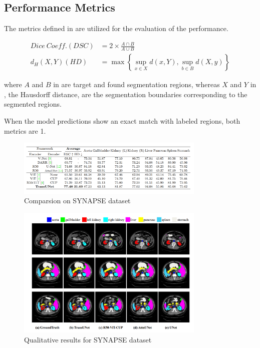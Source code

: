 \documentclass{IEEEtran}
\begin{document}
\subsection{Performance Metrics} 

The metrics defined in  are utilized for the evaluation of the performance.

\begin{align}
    Dice \ Coeff.(DSC) &= 2 \times \frac{A \cap B}{A \cup B} \label{eq:DC}\\
    d_H(X,Y) (HD) &= \max \left\{ \sup_{x\in X} d(x,Y),\sup_{b\in B} d(X,y) \right\} \label{eq:HD}
\end{align}

where $A$ and $B$ in  are target and found segmentation regions, whereas $X$ and $Y$ in , the Hausdorff distance, are the segmentation boundaries corresponding to the segmented regions.

When the model predictions show an exact match with labeled regions, both metrics are 1. 

\begin{figure}[h]
\centering
\includegraphics[width=0.8\textwidth]{img/table1.png}
\caption{Comparsion on SYNAPSE dataset}\label{fig:table}
\end{figure}

\begin{figure}[h]
\centering
\includegraphics[width=0.8\textwidth]{img/results_qual.png}
\caption{Qualitative results for SYNAPSE dataset}\label{fig:synapseseg}
\end{figure}
\end{document}
